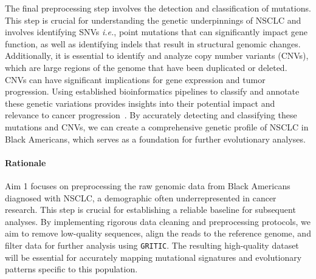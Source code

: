 \vspace{1em}
\noindent
The final preprocessing step involves the detection and classification of mutations. 
This step is crucial for understanding the genetic underpinnings of NSCLC and involves identifying SNVs 
\textit{i.e.}, point mutations that can significantly impact gene function, 
as well as identifying indels that result in structural genomic changes. 
Additionally, it is essential to identify and analyze copy number variants (CNVs), 
which are large regions of the genome that have been duplicated or deleted. 
CNVs can have significant implications for gene expression and tumor progression. 
Using established bioinformatics pipelines to classify and annotate these genetic variations 
provides insights into their potential impact and relevance to cancer progression~\cite{koboldt_best_2020-1}. 
By accurately detecting and classifying these mutations and CNVs, 
we can create a comprehensive genetic profile of NSCLC in Black Americans, 
which serves as a foundation for further evolutionary analyses.


\paragraph{Rationale}

Aim 1 focuses on preprocessing the raw genomic data from Black Americans diagnosed with NSCLC, 
a demographic often underrepresented in cancer research. 
This step is crucial for establishing a reliable baseline for subsequent analyses. 
By implementing rigorous data cleaning and preprocessing protocols, we aim to remove low-quality sequences, 
align the reads to the reference genome, and filter data for further analysis using \texttt{GRITIC}. 
The resulting high-quality dataset will be essential for accurately mapping mutational signatures 
and evolutionary patterns specific to this population.

